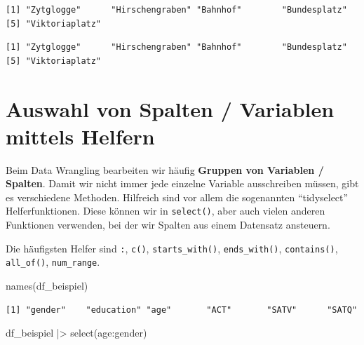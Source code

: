 \documentclass[
  letterpaper,
  DIV=11,
  numbers=noendperiod]{scrreprt}
\newenvironment{Shaded}{\begin{snugshade}}{\end{snugshade}}
\newcommand{\CommentTok}[1]{\textcolor[rgb]{0.37,0.37,0.37}{#1}}
\newcommand{\FunctionTok}[1]{\textcolor[rgb]{0.28,0.35,0.67}{#1}}
\newcommand{\NormalTok}[1]{\textcolor[rgb]{0.00,0.23,0.31}{#1}}
\newcommand{\SpecialCharTok}[1]{\textcolor[rgb]{0.37,0.37,0.37}{#1}}
\begin{document}
\begin{verbatim}
[1] "Zytglogge"      "Hirschengraben" "Bahnhof"        "Bundesplatz"   
[5] "Viktoriaplatz" 
\end{verbatim}

\begin{Shaded}
\end{Shaded}

\begin{verbatim}
[1] "Zytglogge"      "Hirschengraben" "Bahnhof"        "Bundesplatz"   
[5] "Viktoriaplatz" 
\end{verbatim}

\section{Auswahl von Spalten / Variablen mittels
Helfern}\label{auswahl-von-spalten-variablen-mittels-helfern}

Beim Data Wrangling bearbeiten wir häufig \textbf{Gruppen von Variablen
/ Spalten}. Damit wir nicht immer jede einzelne Variable ausschreiben
müssen, gibt es verschiedene Methoden. Hilfreich sind vor allem die
sogenannten ``tidyselect'' Helferfunktionen. Diese können wir in
\texttt{select()}, aber auch vielen anderen Funktionen verwenden, bei
der wir Spalten aus einem Datensatz ansteuern.

Die häufigsten Helfer sind \texttt{:}, \texttt{c()},
\texttt{starts\_with()}, \texttt{ends\_with()}, \texttt{contains()},
\texttt{all\_of()}, \texttt{num\_range}.

\begin{Shaded}
\begin{Highlighting}[]
\FunctionTok{names}\NormalTok{(df\_beispiel)}
\end{Highlighting}
\end{Shaded}

\begin{verbatim}
[1] "gender"    "education" "age"       "ACT"       "SATV"      "SATQ"     
\end{verbatim}

\begin{Shaded}
\begin{Highlighting}[]
\NormalTok{df\_beispiel }\SpecialCharTok{|\textgreater{}} \FunctionTok{select}\NormalTok{(age}\SpecialCharTok{:}\NormalTok{gender)}
\end{Highlighting}
\end{Shaded}
\end{document}
